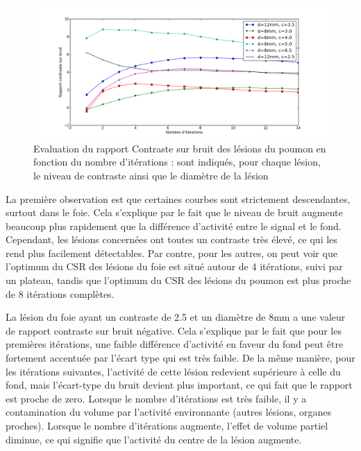 \begin{figure}
\centering
\includegraphics[width=17cm]{images/CNRPoumon}
\caption[Evaluation du rapport "contraste sur bruit" des lésions du poumon en fonction du nombre d'itérations]{Evaluation du rapport Contraste sur bruit des lésions du poumon en fonction du nombre d'itérations : sont indiqués, pour chaque lésion, le niveau de contraste ainsi que le diamètre de la lésion}
\label{fig:CNRPoumon}
\end{figure}

La première observation est que certaines courbes sont strictement descendantes, surtout dans le foie. Cela s'explique par le fait que le niveau de bruit augmente beaucoup plus rapidement que la différence d'activité entre le signal et le fond. Cependant, les lésions concernées ont toutes un contraste très élevé, ce qui les rend plus facilement détectables. Par contre, pour les autres, on peut voir que l'optimum du CSR des lésions du foie est situé autour de 4 itérations, suivi par un plateau, tandis que l'optimum du CSR des lésions du poumon est plus proche de 8 itérations complètes.

La lésion du foie ayant un contraste de 2.5 et un diamètre de 8mm a une valeur de rapport contraste sur bruit négative. Cela s'explique par le fait que pour les premières itérations, une faible différence d'activité en faveur du fond peut être fortement accentuée par l'écart type qui est très faible. De la même manière, pour les itérations suivantes, l'activité de cette lésion redevient supérieure à celle du fond, mais l'écart-type du bruit devient plus important, ce qui fait que le rapport est proche de zero. Lorsque le nombre d'itérations est très faible, il y a contamination du volume par l'activité environnante (autres lésions, organes proches). Lorsque le nombre d'itérations augmente, l'effet de volume partiel diminue, ce qui signifie que l'activité du centre de la lésion augmente.


